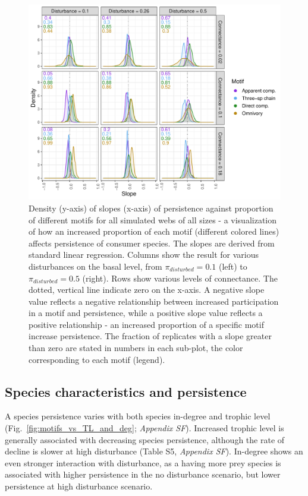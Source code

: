 \documentclass[12pt]{article}
\begin{document}
\begin{spacing}{2.0}
        \begin{figure}[h!]
            \centering
            \includegraphics[width=\textwidth]{figures/prop_dens_bp_vs_C_allS.pdf}
            \caption{Density (y-axis) of slopes (x-axis) of persistence against proportion of different motifs for all simulated webs of all sizes - a visualization of how an increased proportion of each motif (different colored lines) affects persistence of consumer species. The slopes are derived from standard linear regression. Columns show the result for various disturbances on the basal level, from $\pi_{disturbed} = 0.1$ (left) to $\pi_{disturbed} = 0.5$ (right). Rows show various levels of connectance. The dotted, vertical line indicate zero on the x-axis. A negative slope value reflects a negative relationship between increased participation in a motif and persistence, while a positive slope value reflects a positive relationship - an increased proportion of a specific motif increase persistence. The fraction of replicates with a slope greater than zero are stated in numbers in each sub-plot, the color corresponding to each motif (legend). }
            \label{fig:density_prop_C}
        \end{figure}    
    
    \subsection*{Species characteristics and persistence}
    
        A species persistence varies with both species in-degree and trophic level (Fig.~\ref{fig:motifs_vs_TL_and_deg}; \emph{Appendix SF}). Increased trophic level is generally associated with decreasing species persistence, although the rate of decline is slower at high disturbance (Table S5, \emph{Appendix SF}).
        In-degree shows an even stronger interaction with disturbance, as a having more  prey species is associated with higher persistence in the no disturbance scenario, but lower persistence at high disturbance scenario.
        


\end{spacing}
\end{document}

